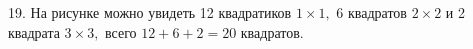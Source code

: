 19. На рисунке можно увидеть 12 квадратиков $1\times1,$ 6 квадратов $2\times2$ и 2 квадрата $3\times3,$ всего $12+6+2=20$ квадратов.\\
